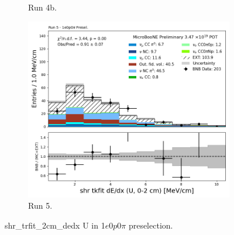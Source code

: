\begin{figure}[H]
\begin{subfigure}[t]{0.32\linewidth}
        \caption{Run 4b.}
    \end{subfigure}%
    \hspace{0.2cm}%
    \begin{subfigure}[t]{0.32\linewidth}
        \includegraphics[width=\linewidth]{technote/Appendix_Preselection/Figures/1e0p0pi/Run5/shr_tkfit_2cm_dedx_U_Run5_1e0p0pi_Presel.png}
        \caption{Run 5.}
    \end{subfigure}
    \caption{shr\_trfit\_2cm\_dedx U in 1$e$0$p$0$\pi$ preselection.}
\end{figure}

